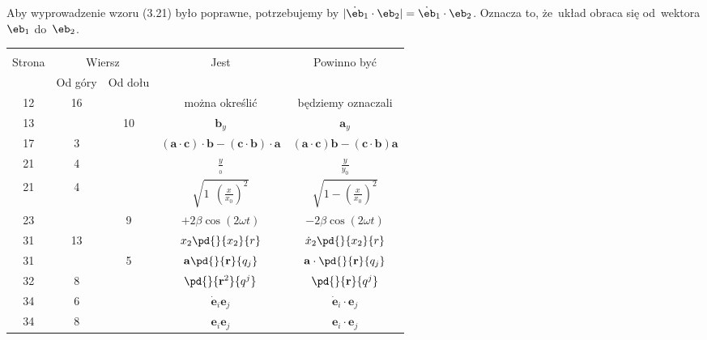 \documentclass[a4paper,11pt]{article}
\begin{document}
\vspace{\spaceFour}


\start {} Aby wyprowadzenie wzoru (3.21) było poprawne,
potrzebujemy by
$| \dot{ \eb }_{ 1 } \cdot \eb_{ 2 } | = \dot{ \eb }_{ 1 } \cdot \eb_{
  2 }$. Oznacza to, że~układ obraca się od~wektora $\eb_{ 1 }$
do~$\eb_{ 2 }$.


\begin{center}
  \begin{tabular}{|c|c|c|c|c|}
    \hline
    & \multicolumn{2}{c|}{} & & \\
    Strona & \multicolumn{2}{c|}{Wiersz} & Jest
                              & Powinno być \\ \cline{2-3}
    & Od góry & Od dołu & & \\
    \hline
    12  & 16 & & można określić & będziemy oznaczali \\
    13  & & 10 & $\mathbf{ b }_{ y }$ & $\mathbf{ a }_{ y }$ \\
    17  &  3 & & $(\mathbf{ a } \cdot \mathbf{ c } ) \cdot \mathbf{ b }
                 - ( \mathbf{ c } \cdot \mathbf{ b } ) \cdot \mathbf{ a }$
           & $(\mathbf{ a } \cdot \mathbf{ c } ) \mathbf{ b }
             - ( \mathbf{ c } \cdot \mathbf{ b } ) \mathbf{ a }$ \\
    21  &  4 & & $\frac{ y }{ { }_{ 0 } }$ & $\frac{ y }{ { y }_{ 0 } }$ \\
    21  &  4 & & $\sqrt{ 1 \:\: \left( \frac{ x }{ x_{ 0 } }
                 \right)^{ 2 } } $
           & $\sqrt{ 1 - \left( \frac{ x }{ x_{ 0 } } \right)^{ 2 } } $ \\
    23  & &  9 & $+2\beta \cos( 2\omega t )$ & $-2\beta
                                               \cos( 2\omega t )$ \\
    31  & 13 & & $x_{ 2 } \pd{}{ x_{ 2 } }{ r }$
           & $\dot{ x }_{ 2 } \pd{}{ x_{ 2 } }{ r }$ \\
    31  & &  5 & $\mathbf{ a } \pd{}{ \mathbf{ r } }{ q_{ j } }$
           & $\mathbf{ a } \cdot \pd{}{ \mathbf{ r } }{ q_{ j } }$ \\
    32  &  8 & & $\pd{}{ { \mathbf{ r }^{ 2 } } }{ { q^{ j } } }$
           & $\pd{}{ \mathbf{ r } }{ { q^{ j } } }$ \\
    34  &  6 & & $\dot{ \mathbf{ e } }_{ i } \mathbf{ e }_{ j }$
           & $\dot{ \mathbf{ e } }_{ i } \cdot \mathbf{ e }_{ j }$ \\
    34  &  8 & & $\mathbf{ e }_{ i } \mathbf{ e }_{ j }$
           & $\mathbf{ e }_{ i } \cdot \mathbf{ e }_{ j }$ \\

\end{tabular}
\end{center}
\end{document}
